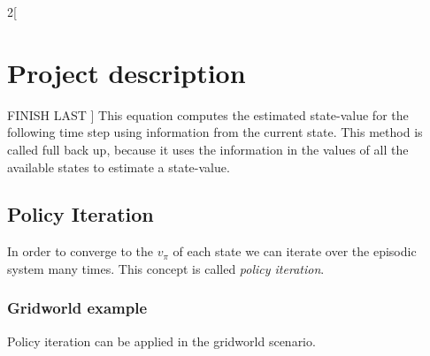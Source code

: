 \documentclass[a4paper]{article}
\begin{document}
\begin{multicols}{2}[
		\section*{Project description}
		FINISH LAST
		]
		This equation computes the estimated state-value for the following time step using information from the current state. This method is called full back up, because it uses the information in the values of all the available states to estimate a state-value.
		
		\subsection{Policy Iteration}
		In order to converge to the $v_\pi$ of each state we can iterate over the episodic system many times. This concept is called \textit{policy iteration}.
		
		\subsubsection{Gridworld example}
		Policy iteration can be applied in the gridworld scenario. \cite{Woer}
		
		
		
		
		\end{multicols}
		\newpage
	
%			
%			






\end{document}

